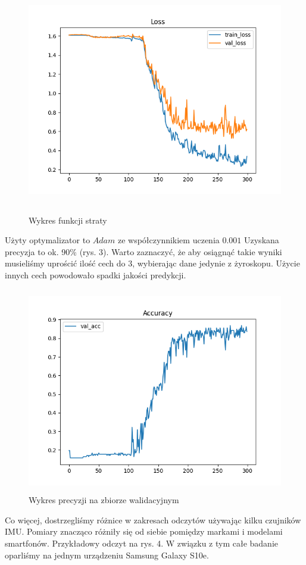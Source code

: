 \documentclass[10pt]{article}
\begin{document}
\begin{figure}[H]
  \includegraphics[height=10cm]{loss.png}
  \centering
  \caption{Wykres funkcji straty}
\end{figure}

Użyty optymalizator to $Adam$ ze współczynnikiem uczenia $0.001$
 Uzyskana precyzja to ok. 90\% (rys. 3). Warto zaznaczyć, że aby osiągnąć takie wyniki musieliśmy uprościć ilość cech do 3, wybierając dane jedynie z żyroskopu. Użycie innych cech powodowało spadki jakości predykcji.

 \begin{figure}[H]
  \includegraphics[height=9cm]{acc.png}
  \centering
  \caption{Wykres precyzji na zbiorze walidacyjnym}
\end{figure}

Co więcej, dostrzegliśmy różnice w zakresach odczytów używając kilku czujników IMU. Pomiary znacząco różniły się od siebie pomiędzy markami i modelami smartfonów. Przykładowy odczyt na rys. 4. W związku z tym całe badanie oparliśmy na jednym urządzeniu Samsung Galaxy S10e.
\end{document}
